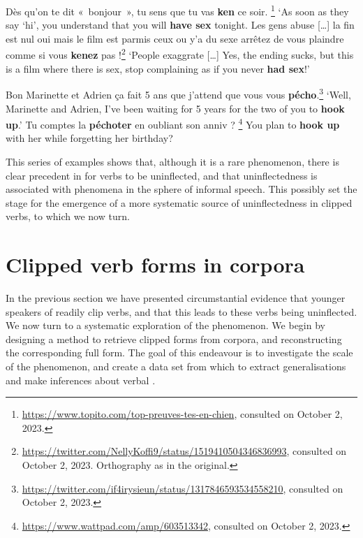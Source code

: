 \documentclass[output=paper,colorlinks,citecolor=brown]{langscibook}
\begin{document}
\begin{exe}
	\ex\label{ex:ken}\begin{xlist}
		\ex Dès qu'on te dit «~bonjour~», tu sens que tu vas \textbf{ken} ce soir.
		\footnote{\url{https://www.topito.com/top-preuves-tes-en-chien}, consulted on October 2, 2023.}
		\trans ‘As soon as they say ‘hi’, you understand that you will \textbf{have sex} tonight.
		\ex Les gens abuse [\ldots] la fin est nul oui mais le film est parmis ceux ou y’a du sexe arrêtez de vous plaindre comme si vous \textbf{kenez} pas !\footnote{\url{https://twitter.com/NellyKoffi9/status/1519410504346836993}, consulted on October 2, 2023. Orthography as in the original.}
		\trans ‘People exaggrate [\ldots] Yes, the ending sucks, but this is a film where there is sex, stop complaining as if you never \textbf{had sex}!’
	\end{xlist}
	\ex\label{ex:pecho}\begin{xlist}
		\ex Bon Marinette et Adrien ça fait 5 ans que j’attend que vous vous \textbf{pécho}.\footnote{\url{https://twitter.com/if4irysieun/status/1317846593534558210}, consulted on October 2, 2023.}
		\trans ‘Well, Marinette and Adrien, I've been waiting for 5 years for the two of you to \textbf{hook up}.’
		\ex Tu comptes la \textbf{péchoter} en oubliant son anniv ?%
		\footnote{\url{https://www.wattpad.com/amp/603513342}, consulted on October 2, 2023.}
		\trans You plan to \textbf{hook up} with her while forgetting her birthday?
	\end{xlist}
\end{exe}

This series of examples shows that, although it is a rare phenomenon, there is clear precedent in  for verbs to be uninflected, and that uninflectedness is associated with phenomena in the sphere of informal speech. This possibly set the stage for the emergence of a more systematic source of uninflectedness in clipped verbs, to which we now turn.

\section{Clipped verb forms in corpora}\label{sec:corpus}

In the previous section we have presented circumstantial evidence that younger speakers of  readily clip verbs, and that this leads to these verbs being uninflected. We now turn to a systematic exploration of the phenomenon.
We begin by designing a method to retrieve clipped forms from corpora, and reconstructing the corresponding full form. The goal of this endeavour is to investigate the scale of the phenomenon, and create a data set from which to extract generalisations and make inferences about verbal .
\end{document}
